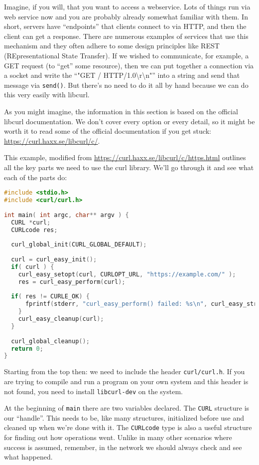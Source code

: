 Imagine, if you will, that you want to access a webservice. Lots of things run via web service now and you are probably already somewhat familiar with them. In short, servers have ``endpoints'' that clients connect to via HTTP, and then the client can get a response. There are numerous examples of services that use this mechanism and they often adhere to some design principles like REST (REpresentational State Transfer). If we wished to communicate, for example, a GET request (to ``get'' some resource), then we can put together a connection via a socket and write the ``"GET / HTTP/1.0\textbackslash r\textbackslash n"'' into a string and send that message via \texttt{send()}. But there's no need to do it all by hand because we can do this very easily with libcurl.

As you might imagine, the information in this section is based on the official libcurl documentation. We don't cover every option or every detail, so it might be worth it to read some of the official documentation if you get stuck: \url{https://curl.haxx.se/libcurl/c/}.

This example, modified from \url{https://curl.haxx.se/libcurl/c/https.html} outlines all the key parts we need to use the curl library. We'll go through it and see what each of the parts do:

\begin{lstlisting}[language=C]
#include <stdio.h>
#include <curl/curl.h>
 
int main( int argc, char** argv ) {
  CURL *curl;
  CURLcode res;
 
  curl_global_init(CURL_GLOBAL_DEFAULT);
 
  curl = curl_easy_init();
  if( curl ) {
    curl_easy_setopt(curl, CURLOPT_URL, "https://example.com/" );
    res = curl_easy_perform(curl);
    
  if( res != CURLE_OK) {
      fprintf(stderr, "curl_easy_perform() failed: %s\n", curl_easy_strerror(res));
    }
    curl_easy_cleanup(curl);
  }
 
  curl_global_cleanup();
  return 0;
}
\end{lstlisting}

Starting from the top then: we need to include the header \texttt{curl/curl.h}. If you are trying to compile and run a program on your own system and this header is not found, you need to install \texttt{libcurl-dev} on the system.

At the beginning of \texttt{main} there are two variables declared. The \texttt{CURL} structure is our ``handle''. This needs to be, like many structures, initialized before use and cleaned up when we're done with it. The \texttt{CURLcode} type is also a useful structure for finding out how operations went. Unlike in many other scenarios where success is assumed, remember, in the network we should always check and see what happened.

